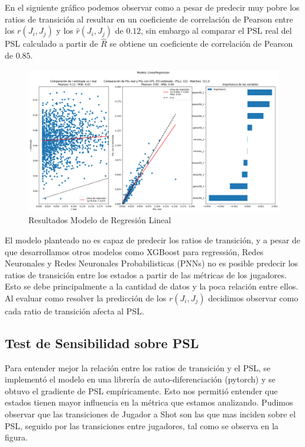 \documentclass[
  a4paper,
]{article}
\begin{document}
En el siguiente gráfico podemos observar como a pesar de predecir muy
pobre los ratios de transición al resultar en un coeficiente de
correlación de Pearson entre los \(r(J_i, J_j)\) y los
\(\hat{r}(J_i, J_j)\) de \(0.12\), sin embargo al comparar el PSL real
del PSL calculado a partir de \(\hat{R}\) se obtiene un coeficiente de
correlación de Pearson de \(0.85\).

\begin{figure}
  \includegraphics{recursos_pdf/graficos/regresion_lineal_r_p.png}
    \caption{Resultados Modelo de Regresión Lineal}
\end{figure}

El modelo planteado no es capaz de predecir los ratios de transición, y
a pesar de que desarrollamos otros modelos como XGBoost para regressión,
Redes Neuronales y Redes Neuronales Probabilisticas (PNNs) no es posible
predecir los ratios de transición entre los estados a partir de las
métricas de los jugadores. Esto se debe principalmente a la cantidad de
datos y la poca relación entre ellos. Al evaluar como resolver la
predicción de los \(r(J_i, J_j)\) decidimos observar como cada ratio de
transición afecta al PSL.

\hypertarget{test-de-sensibilidad-sobre-psl}{%
\subsection{Test de Sensibilidad sobre
PSL}\label{test-de-sensibilidad-sobre-psl}}

Para entender mejor la relación entre los ratios de transición y el PSL,
se implementó el modelo en una librería de auto-diferenciación (pytorch)
y se obtuvo el gradiente de PSL empíricamente. Esto nos permitió
entender que estados tienen mayor influencia en la métrica que estamos
analizando. Pudimos observar que las transiciones de Jugador a Shot son
las que mas inciden sobre el PSL, seguido por las transiciones entre
jugadores, tal como se observa en la figura.
\end{document}
